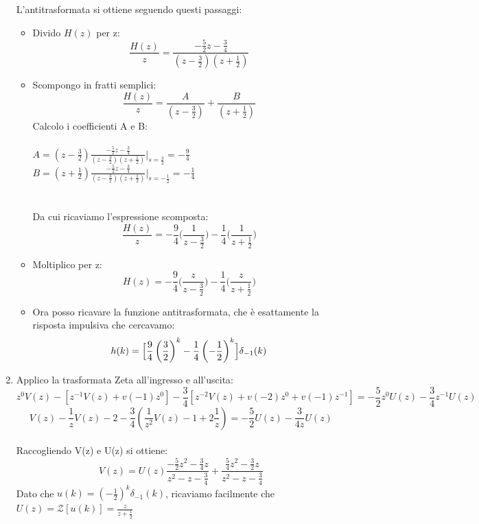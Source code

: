 \documentclass[12pt,a4paper]{article}
\begin{document}
\begin{enumerate}
\[	\]
	L'antitrasformata si ottiene seguendo questi passaggi:
	\begin{itemize}
		\item Divido $H(z)$ per z:
		\[
			\frac{H(z)}{z} = \frac{-\frac{5}{2}z - \frac{3}{4}}{\left(z-\frac{3}{2}\right)\left(z+\frac{1}{2}\right)}
		\]
		\item Scompongo in fratti semplici:
		\[
			\frac{H(z)}{z} = \frac{A}{\left(z-\frac{3}{2}\right)} + \frac{B}{\left(z+\frac{1}{2}\right)}
		\]
		Calcolo i coefficienti A e B:\\ \\
		$A = \left(z-\frac{3}{2}\right)\frac{-\frac{5}{2}z - \frac{3}{4}}{\left(z-\frac{3}{2}\right)\left(z+\frac{1}{2}\right)}\Biggl\vert_{s=\frac{3}{2}} = -\frac{9}{4}$\\
		$B = \left(z+\frac{1}{2}\right)\frac{-\frac{5}{2}z - \frac{3}{4}}{\left(z-\frac{3}{2}\right)\left(z+\frac{1}{2}\right)}\Biggl\vert_{s=-\frac{1}{2}} = -\frac{1}{4}$\\
		\\ \\
		Da cui ricaviamo l'espressione scomposta:
		\[
			\frac{H(z)}{z} = -\frac{9}{4}\Biggl(\frac{1}{z-\frac{3}{2}}\Biggr) - \frac{1}{4}\Biggl(\frac{1}{z+\frac{1}{2}}\Biggr)
		\]
		\item Moltiplico per z:
		\[
			H(z) = -\frac{9}{4}\Biggl(\frac{z}{z-\frac{3}{2}}\Biggr) - \frac{1}{4}\Biggl(\frac{z}{z+\frac{1}{2}}\Biggr)
		\]
		\item Ora posso ricavare la funzione antitrasformata, che è esattamente la risposta impulsiva che cercavamo:
		\[
			h(k) = \Bigl[\frac{9}{4}\left(\frac{3}{2}\right)^k - \frac{1}{4}\left(-\frac{1}{2}\right)^k\Bigr]\delta_{-1}(k)
		\]
	\end{itemize}
	\item Applico la trasformata Zeta all'ingresso e all'uscita:
	\[
		z^0V(z) - [z^{-1}V(z) + v(-1)z^0] - \frac{3}{4}[z^{-2}V(z) + v(-2)z^0 + v(-1)z^{-1}] = -\frac{5}{2}z^0U(z)-\frac{3}{4}z^{-1}U(z)
	\]
	\[
		V(z) - \frac{1}{z}V(z) - 2 - \frac{3}{4}\left(\frac{1}{z^2}V(z)-1+2\frac{1}{z}\right) = -\frac{5}{2}U(z) - \frac{3}{4z}U(z)
	\]
	\\
	Raccogliendo V(z) e U(z) si ottiene:
	\[
		V(z) = U(z)\frac{-\frac{5}{2}z^2-\frac{3}{4}z}{z^2-z-\frac{3}{4}} + \frac{\frac{5}{4}z^2-\frac{3}{2}z}{z^2-z-\frac{3}{4}}
	\]
	Dato che $u(k) = \left(-\frac{1}{2}\right)^k\delta_{-1}(k)$, ricaviamo facilmente che $U(z) = \mathcal{Z}[u(k)] = \frac{z}{z+\frac{1}{2}}$\\ \\

\end{enumerate}
\end{document}
